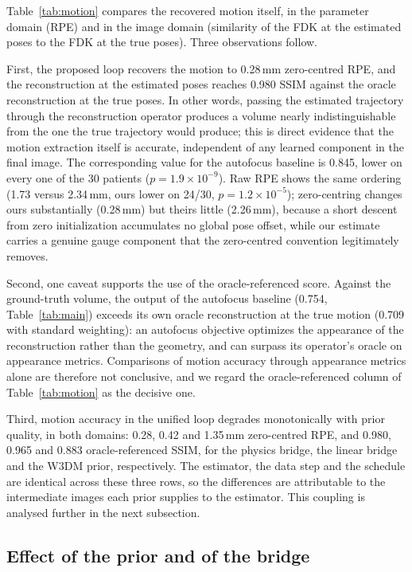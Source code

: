 \documentclass[11pt]{article}
\begin{document}
Table~\ref{tab:motion} compares the recovered motion itself, in the parameter domain (RPE)
and in the image domain (similarity of the FDK at the estimated poses to the FDK at the true
poses). Three observations follow.

First, the proposed loop recovers the motion to 0.28\,mm zero-centred RPE, and the
reconstruction at the estimated poses reaches 0.980 SSIM against the oracle reconstruction at
the true poses. In other words, passing the estimated trajectory through the reconstruction
operator produces a volume nearly indistinguishable from the one the true trajectory would
produce; this is direct evidence that the motion extraction itself is accurate, independent
of any learned component in the final image. The corresponding value for the autofocus
baseline is 0.845, lower on every one of the 30 patients ($p=1.9\times10^{-9}$). Raw RPE
shows the same ordering (1.73 versus 2.34\,mm, ours lower on 24/30, $p=1.2\times10^{-5}$);
zero-centring changes ours substantially (0.28\,mm) but theirs little (2.26\,mm), because a
short descent from zero initialization accumulates no global pose offset, while our estimate
carries a genuine gauge component that the zero-centred convention legitimately removes.

Second, one caveat supports the use of the oracle-referenced score. Against the ground-truth
volume, the output of the autofocus baseline (0.754, Table~\ref{tab:main}) exceeds its own
oracle reconstruction at the true motion (0.709 with standard weighting): an autofocus
objective optimizes the appearance of the reconstruction rather than the geometry, and can
surpass its operator's oracle on appearance metrics. Comparisons of motion accuracy through
appearance metrics alone are therefore not conclusive, and we regard the oracle-referenced
column of Table~\ref{tab:motion} as the decisive one.

Third, motion accuracy in the unified loop degrades monotonically with prior quality, in both
domains: 0.28, 0.42 and 1.35\,mm zero-centred RPE, and 0.980, 0.965 and 0.883
oracle-referenced SSIM, for the physics bridge, the linear bridge and the W3DM prior,
respectively. The estimator, the data step and the schedule are identical across these three
rows, so the differences are attributable to the intermediate images each prior supplies to
the estimator. This coupling is analysed further in the next subsection.

\subsection{Effect of the prior and of the bridge}
\label{sec:results-arms}
\end{document}

